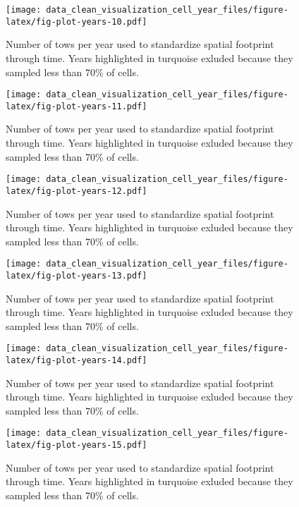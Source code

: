 \documentclass[
]{article}
\begin{document}
\begin{figure}
\centering
\texttt{[image: data\_clean\_visualization\_cell\_year\_files/figure-latex/fig-plot-years-10.pdf]}
\caption{\label{fig:fig-plot-years-10}Number of tows per year used to standardize spatial footprint through time. Years highlighted in turquoise exluded because they sampled less than 70\% of cells.}
\end{figure}

\begin{figure}
\centering
\texttt{[image: data\_clean\_visualization\_cell\_year\_files/figure-latex/fig-plot-years-11.pdf]}
\caption{\label{fig:fig-plot-years-11}Number of tows per year used to standardize spatial footprint through time. Years highlighted in turquoise exluded because they sampled less than 70\% of cells.}
\end{figure}

\begin{figure}
\centering
\texttt{[image: data\_clean\_visualization\_cell\_year\_files/figure-latex/fig-plot-years-12.pdf]}
\caption{\label{fig:fig-plot-years-12}Number of tows per year used to standardize spatial footprint through time. Years highlighted in turquoise exluded because they sampled less than 70\% of cells.}
\end{figure}

\begin{figure}
\centering
\texttt{[image: data\_clean\_visualization\_cell\_year\_files/figure-latex/fig-plot-years-13.pdf]}
\caption{\label{fig:fig-plot-years-13}Number of tows per year used to standardize spatial footprint through time. Years highlighted in turquoise exluded because they sampled less than 70\% of cells.}
\end{figure}

\begin{figure}
\centering
\texttt{[image: data\_clean\_visualization\_cell\_year\_files/figure-latex/fig-plot-years-14.pdf]}
\caption{\label{fig:fig-plot-years-14}Number of tows per year used to standardize spatial footprint through time. Years highlighted in turquoise exluded because they sampled less than 70\% of cells.}
\end{figure}

\begin{figure}
\centering
\texttt{[image: data\_clean\_visualization\_cell\_year\_files/figure-latex/fig-plot-years-15.pdf]}
\caption{\label{fig:fig-plot-years-15}Number of tows per year used to standardize spatial footprint through time. Years highlighted in turquoise exluded because they sampled less than 70\% of cells.}
\end{figure}
\end{document}
